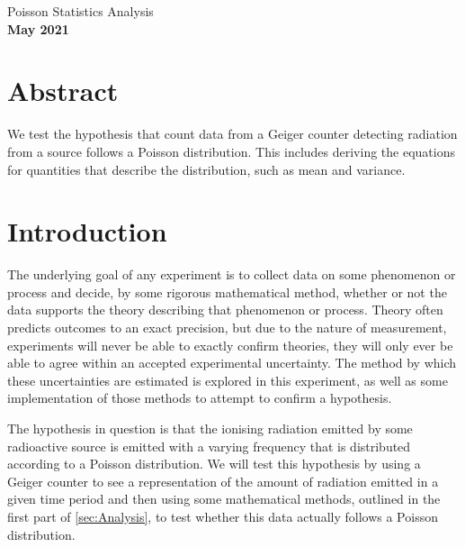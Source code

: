 \documentclass[12pt]{article}
\numberwithin{equation}{section}
\numberwithin{figure}{section}
\numberwithin{table}{section}
\begin{document}
\begin{center}
    {\huge Poisson Statistics Analysis}\\
    \vspace{0.2in}
    \textbf{May 2021}

    \section*{Abstract}
    We test the hypothesis that count data from a Geiger counter detecting radiation from a  source follows a Poisson distribution. This includes deriving the equations for quantities that describe the distribution, such as mean and variance. 

\end{center}

\section{Introduction}\label{sec:Introduction}
\par The underlying goal of any experiment is to collect data on some phenomenon or process and decide, by some rigorous mathematical method, whether or not the data supports the theory describing that phenomenon or process. Theory often predicts outcomes to an exact precision, but due to the nature of measurement, experiments will never be able to exactly confirm theories, they will only ever be able to agree within an accepted experimental uncertainty. The method by which these uncertainties are estimated is explored in this experiment, as well as some implementation of those methods to attempt to confirm a hypothesis. 
\par The hypothesis in question is that the ionising radiation emitted by some radioactive source is emitted with a varying frequency that is distributed according to a Poisson distribution. We will test this hypothesis by using a Geiger counter to see a representation of the amount of radiation emitted in a given time period and then using some mathematical methods, outlined in the first part of \autoref{sec:Analysis}, to test whether this data actually follows a Poisson distribution.
\end{document}
